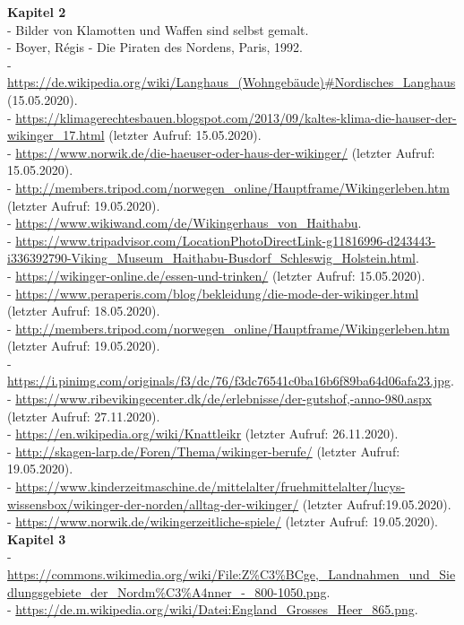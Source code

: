 \documentclass[12pt,a4paper,ngerman,openany]{book}
\begin{document}
\textbf{Kapitel 2}\\
- Bilder von Klamotten und Waffen sind selbst gemalt.\\
- Boyer, Régis - Die Piraten des Nordens, Paris, 1992.\\
- \url{https://de.wikipedia.org/wiki/Langhaus_(Wohngebäude)#Nordisches_Langhaus} (15.05.2020).\\
- \url{https://klimagerechtesbauen.blogspot.com/2013/09/kaltes-klima-die-hauser-der-wikinger_17.html} (letzter Aufruf: 15.05.2020).\\
- \url{https://www.norwik.de/die-haeuser-oder-haus-der-wikinger/} (letzter Aufruf: 15.05.2020).\\
- \url{http://members.tripod.com/norwegen_online/Hauptframe/Wikingerleben.htm} (letzter Aufruf: 19.05.2020).\\
- \url{https://www.wikiwand.com/de/Wikingerhaus_von_Haithabu}.\\
- \url{https://www.tripadvisor.com/LocationPhotoDirectLink-g11816996-d243443-i336392790-Viking_Museum_Haithabu-Busdorf_Schleswig_Holstein.html}.\\
- \url{https://wikinger-online.de/essen-und-trinken/} (letzter Aufruf: 15.05.2020).\\
- \url{https://www.peraperis.com/blog/bekleidung/die-mode-der-wikinger.html} (letzter Aufruf: 18.05.2020).\\
- \url{http://members.tripod.com/norwegen_online/Hauptframe/Wikingerleben.htm} (letzter Aufruf: 19.05.2020).\\
- \url{https://i.pinimg.com/originals/f3/dc/76/f3dc76541c0ba16b6f89ba64d06afa23.jpg}.\\
- \url{https://www.ribevikingecenter.dk/de/erlebnisse/der-gutshof,-anno-980.aspx}  (letzter Aufruf: 27.11.2020).\\
- \url{https://en.wikipedia.org/wiki/Knattleikr} (letzter Aufruf: 26.11.2020).\\
- \url{http://skagen-larp.de/Foren/Thema/wikinger-berufe/} (letzter Aufruf: 19.05.2020).\\
- \url{https://www.kinderzeitmaschine.de/mittelalter/fruehmittelalter/lucys-wissensbox/wikinger-der-norden/alltag-der-wikinger/} (letzter Aufruf:19.05.2020).\\
- \url{https://www.norwik.de/wikingerzeitliche-spiele/} (letzter Aufruf: 19.05.2020).\\

\textbf{Kapitel 3}\\
- \url{https://commons.wikimedia.org/wiki/File:Z\%C3\%BCge,_Landnahmen_und_Siedlungsgebiete_der_Nordm\%C3\%A4nner_-_800-1050.png}.\\
- \url{https://de.m.wikipedia.org/wiki/Datei:England_Grosses_Heer_865.png}.\\
\end{document}
